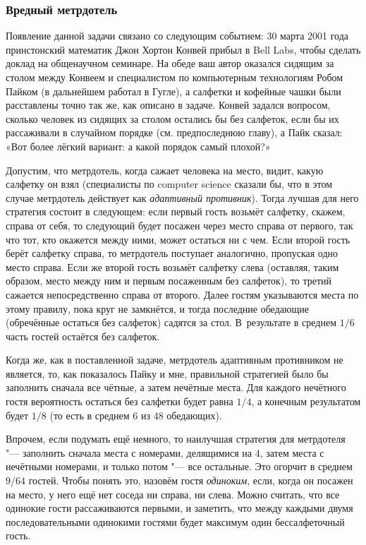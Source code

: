 \documentclass[twoside]{book}
\begin{document}
\subsubsection*{Вредный метрдотель}%

Появление данной задачи связано со следующим событием:
30 марта 2001 года принстонский математик Джон Хортон Конвей %
прибыл в Bell Labs, %
чтобы сделать доклад на общенаучном семинаре. %
На обеде ваш автор оказался сидящим за столом между Конвеем и специалистом по компьютерным технологиям Робом Пайком %
(в дальнейшем работал в Гугле), а салфетки и кофейные чашки были расставлены точно так же, как описано в задаче.
Конвей задался вопросом, сколько человек из
сидящих за столом остались бы без салфеток, если бы их рассаживали в случайном порядке (см. предпоследнюю главу), а Пайк сказал: «Вот более лёгкий вариант: а какой порядок самый плохой?»

\bigskip

Допустим, что метрдотель, когда сажает человека на место, видит, какую
салфетку он взял (специалисты по computer science сказали бы, что в этом случае метрдотель действует как \emph{адаптивный противник}). %
Тогда лучшая для него стратегия состоит в следующем:
если первый гость возьмёт салфетку, скажем, справа от себя, то следующий будет посажен через место справа от первого, так что тот, кто окажется между ними, может остаться ни с чем.
Если второй гость берёт салфетку справа, то метрдотель поступает аналогично, пропуская одно место справа.
Если же второй гость возьмёт салфетку слева (оставляя, таким образом, место между ним и первым посаженным без салфеток), то третий сажается непосредственно справа от второго.
Далее гостям указываются места по этому правилу, пока круг не замкнётся, и тогда последние обедающие (обречённые остаться без салфеток) садятся за стол.
В~результате в среднем $1/6$ часть гостей остаётся без салфеток.

Когда же, как в поставленной задаче, метрдотель адаптивным противником не является, то, как показалось Пайку и мне, правильной стратегией было бы заполнить сначала все чётные, а затем нечётные места.
Для каждого нечётного гостя вероятность остаться без салфетки будет равна $1/4$, %
а конечным результатом будет $1/8$ (то есть в среднем 6 из 48 обедающих).

Впрочем, если подумать ещё немного, то наилучшая стратегия для метрдотеля "--- заполнить сначала места с номерами, делящимися на 4, затем места с нечётными номерами, и только потом "--- все остальные.
Это огорчит в среднем $9/64$ гостей.
Чтобы понять это, назовём гостя \emph{одиноким}, если, когда он посажен на место, у него ещё нет соседа ни справа, ни слева.
Можно считать, что все одинокие гости рассаживаются первыми, и заметить, что между каждыми двумя последовательными одинокими гостями будет максимум один бессалфеточный гость.
\end{document}
